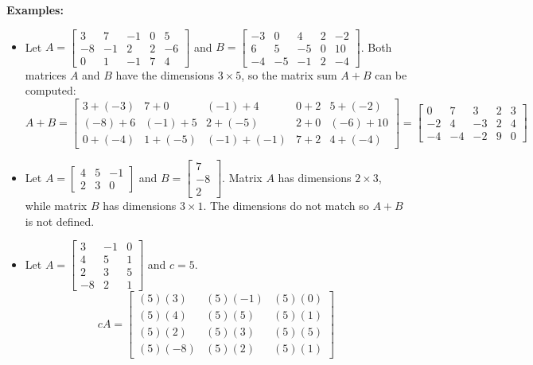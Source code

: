 \documentclass{article}
\begin{document}
\textbf{Examples:}
\begin{itemize}
\item Let \(A = \begin{bmatrix} 3 & 7 & -1 & 0 & 5 \\ -8 & -1 & 2 & 2 & -6 \\ 0 & 1 & -1 & 7 & 4 \end{bmatrix}\) and \(B = \begin{bmatrix} -3 & 0 & 4 & 2 & -2 \\ 6 & 5 & -5 & 0 & 10 \\ -4 & -5 & -1 & 2 & -4 \end{bmatrix}\). Both matrices \(A\) and \(B\) have the dimensions \(3 \times 5\), so the matrix sum \(A + B\) can be computed:
\[A + B 
= \begin{bmatrix} 3 + (-3) & 7 + 0 & (-1) + 4 & 0 + 2 & 5 + (-2) \\ (-8) + 6 & (-1) + 5 & 2 + (-5) & 2 + 0 & (-6) + 10 \\ 0 + (-4) & 1 + (-5) & (-1) + (-1) & 7 + 2 & 4 + (-4) \end{bmatrix}
= \begin{bmatrix} 0 & 7 & 3 & 2 & 3 \\ -2 & 4 & -3 & 2 & 4 \\ -4 & -4 & -2 & 9 & 0 \end{bmatrix}\] 
\item Let \(A = \begin{bmatrix} 4 & 5 & -1 \\ 2 & 3 & 0 \end{bmatrix}\) and \(B = \begin{bmatrix} 7 \\ -8 \\ 2 \end{bmatrix}\). Matrix \(A\) has dimensions \(2 \times 3\), while matrix \(B\) has dimensions \(3 \times 1\). The dimensions do not match so \(A + B\) is not defined.
\item Let \(A = \begin{bmatrix} 3 & -1 & 0 \\ 4 & 5 & 1 \\ 2 & 3 & 5 \\ -8 & 2 & 1 \end{bmatrix}\) and \(c = 5\).
\[cA 
= \begin{bmatrix} (5)(3) & (5)(-1) & (5)(0) \\ (5)(4) & (5)(5) & (5)(1) \\ (5)(2) & (5)(3) & (5)(5) \\ (5)(-8) & (5)(2) & (5)(1) \end{bmatrix}
\]
\end{itemize}
\end{document}

